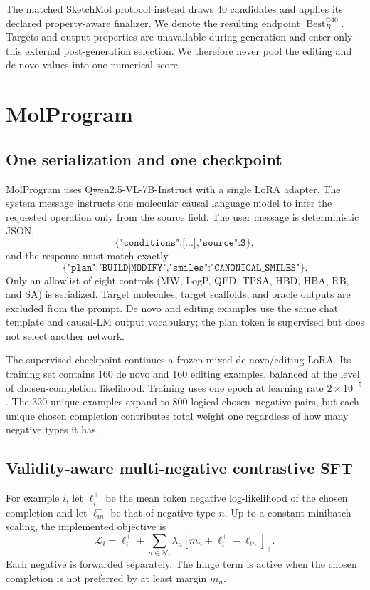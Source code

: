 The matched SketchMol protocol instead draws 40 candidates and applies its
declared property-aware finalizer. We denote the resulting endpoint
$\operatorname{Best}_{B}^{@40}$. Targets and output properties are unavailable
during generation and enter only this external post-generation selection. We
therefore never pool the editing and de novo values into one numerical score.

\section{MolProgram}
\subsection{One serialization and one checkpoint}
MolProgram uses Qwen2.5-VL-7B-Instruct with a single LoRA adapter. The system
message instructs one molecular causal language model to infer the requested
operation only from the source field. The user message is deterministic JSON,
\begin{equation}
  \texttt{\{"conditions":[...],"source":S\}},
  \label{eq:input-schema}
\end{equation}
and the response must match exactly
\begin{equation}
  \texttt{\{"plan":"BUILD|MODIFY","smiles":"CANONICAL\_SMILES"\}}.
  \label{eq:output-schema}
\end{equation}
Only an allowlist of eight controls (MW, LogP, QED, TPSA, HBD, HBA, RB, and
SA) is serialized. Target molecules, target scaffolds, and oracle outputs are
excluded from the prompt. De novo and editing examples use the same chat
template and causal-LM output vocabulary; the plan token is supervised but
does not select another network.

The supervised checkpoint continues a frozen mixed de novo/editing LoRA. Its
training set contains 160 de novo and 160 editing examples, balanced at the
level of chosen-completion likelihood. Training uses one epoch at learning
rate $2\times10^{-5}$. The 320 unique examples expand to 800 logical
chosen--negative pairs, but each unique chosen completion contributes total
weight one regardless of how many negative types it has.

\subsection{Validity-aware multi-negative contrastive SFT}
For example $i$, let $\ell_i^+$ be the mean token negative log-likelihood of
the chosen completion and let $\ell_{in}^-$ be that of negative type $n$. Up
to a constant minibatch scaling, the implemented objective is
\begin{equation}
  \mathcal L_i=\ell_i^+
  +\sum_{n\in\mathcal N_i}\lambda_n
  \left[m_n+\ell_i^+-\ell_{in}^-\right]_+ .
  \label{eq:multinegative-objective}
\end{equation}
Each negative is forwarded separately. The hinge term is active when the
chosen completion is not preferred by at least margin $m_n$.

